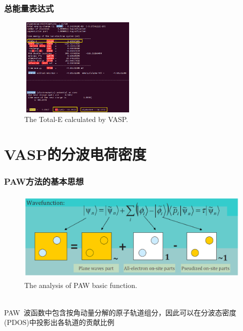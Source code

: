 \documentclass[cjk,slidestop,handout,compress,mathserif,blue]{beamer}	%
\begin{document}
\frame
{
	\frametitle{总能量表达式}
\fontsize{6.5pt}{4.2pt}
\begin{figure}[h!]
\centering
\vspace*{-0.18in}
\includegraphics[height=1.85in,width=2.2in,viewport=0 0 600 495,clip]{Figures/VASP_Total_ENE.png}
\caption{\small \textrm{The Total-E calculated by VASP.}}%
\label{TOTEN_VASP}
\end{figure}
}

\section{\rm{VASP}的分波电荷密度}
\frame
{
	\frametitle{\textrm{PAW}方法的基本思想}
	\vspace{10pt}
\begin{figure}[h!]
\centering
\vspace*{-0.18in}
\includegraphics[height=1.7in,width=4.in,viewport=30 210 570 440,clip]{Figures/PAW_projector.eps}
\caption{\small \textrm{The analysis of PAW basic function.}}%
\label{PAW_baisc}
\end{figure}
{\fontsize{7.2pt}{4.2pt}}\\
\textrm{PAW}~波函数中包含按角动量分解的原子轨道组分，因此可以在分波态密度(\textrm{PDOS})中投影出各轨道的贡献比例
}
\end{document}
